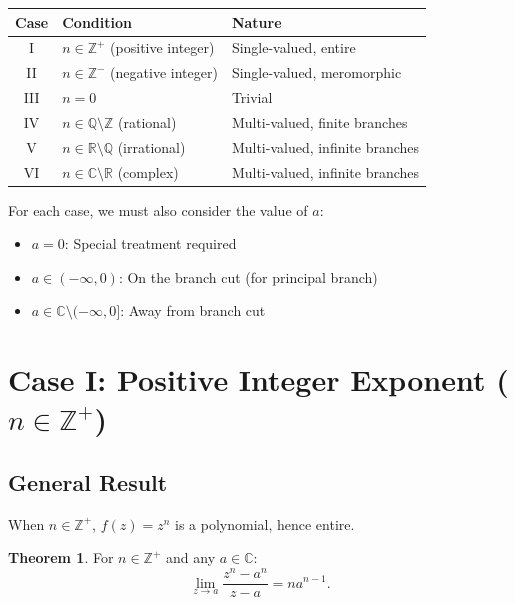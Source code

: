 \documentclass{article}
\theoremstyle{definition}
\newtheorem{theorem}{Theorem}[section]
\theoremstyle{remark}
\newcommand{\C}{\mathbb{C}}
\newcommand{\R}{\mathbb{R}}
\newcommand{\Z}{\mathbb{Z}}
\newcommand{\Q}{\mathbb{Q}}
\begin{document}
\begin{center}
\renewcommand{\arraystretch}{1.4}
\begin{tabular}{|c|l|l|}
\hline
\textbf{Case} & \textbf{Condition} & \textbf{Nature} \\
\hline
I & $n \in \Z^+$ (positive integer) & Single-valued, entire \\
II & $n \in \Z^-$ (negative integer) & Single-valued, meromorphic \\
III & $n = 0$ & Trivial \\
IV & $n \in \Q \setminus \Z$ (rational) & Multi-valued, finite branches \\
V & $n \in \R \setminus \Q$ (irrational) & Multi-valued, infinite branches \\
VI & $n \in \C \setminus \R$ (complex) & Multi-valued, infinite branches \\
\hline
\end{tabular}
\end{center}

For each case, we must also consider the value of $a$:
\begin{itemize}
    \item $a = 0$: Special treatment required
    \item $a \in (-\infty, 0)$: On the branch cut (for principal branch)
    \item $a \in \C \setminus (-\infty, 0]$: Away from branch cut
\end{itemize}

\section{Case I: Positive Integer Exponent ($n \in \Z^+$)}

\subsection{General Result}

When $n \in \Z^+$, $f(z) = z^n$ is a polynomial, hence entire.

\begin{theorem}
For $n \in \Z^+$ and any $a \in \C$:
\begin{equation}
\lim_{z \to a} \frac{z^n - a^n}{z - a} = n a^{n-1}.
\end{equation}
\end{theorem}
\end{document}
